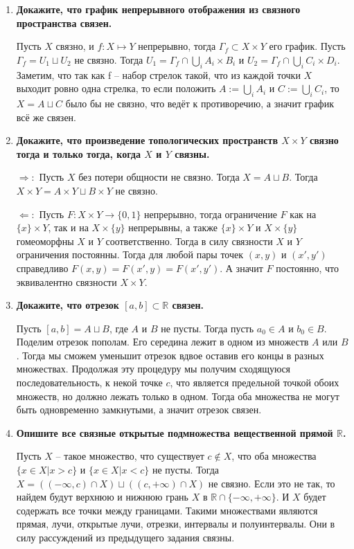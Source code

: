 \documentclass{article}
\begin{document}
\begin{enumerate}
    \item \textbf{Докажите, что график непрерывного отображения из связного
        пространства связен.} \par Пусть $X$ связно, и $f: X\mapsto Y$ непрерывно,
        тогда $\Gamma_f\subset X\times Y$ его график. Пусть $\Gamma_f=U_1\sqcup
        U_2$ не связно. Тогда $U_1=\Gamma_f\cap\bigcup_i A_i\times B_i$ и $U_2=
        \Gamma_f\cap\bigcup_iC_i\times D_i$. Заметим, что так как f – набор
        стрелок такой, что из каждой точки $X$ выходит ровно одна стрелка, то
        если положить $A:=\bigcup_i A_i$ и $C:=\bigcup_i C_i$, то $X=A\sqcup C$
        было бы не связно, что ведёт к противоречию, а значит график всё же
        связен.
    \item \textbf{Докажите, что произведение топологических пространств $X\times
        Y$ связно тогда и только тогда, когда $X$ и $Y$ связны.}\par
        $\Rightarrow:$ Пусть $X$ без потери общности не связно. Тогда $X=A\sqcup
        B$. Тогда $X\times Y = A\times Y\sqcup B\times Y$ не связно.\par
        $\Leftarrow:$ Пусть $F:X\times Y\longrightarrow \{0, 1\}$ непрерывно,
        тогда ограничение $F$ как на $\{x\}\times Y$, так и на $X\times \{y\}$
        непрерывны, а также $\{x\}\times Y$ и $X\times \{y\}$ гомеоморфны $X$ и
        $Y$ соответственно. Тогда в силу связности $X$ и $Y$ ограничения
        постоянны. Тогда для любой пары точек $(x,y)$ и $(x',y')$ справедливо
        $F(x,y)=F(x',y)=F(x',y')$. А значит $F$ постоянно, что эквивалентно
        связности $X\times Y$.
    \item \textbf{Докажите, что отрезок $[a, b]\subset \mathbb{R}$ связен.}\par
        Пусть $[a, b] = A\sqcup B$, где $A$ и $B$ не пусты. Тогда
        пусть $a_0\in A$ и $b_0\in B$. Поделим отрезок пополам. Его середина
        лежит в одном из множеств $A$ или $B$. Тогда мы сможем уменьшит отрезок
        вдвое оставив его концы в разных множествах. Продолжая эту процедуру мы
        получим сходящуюся последовательность, к некой точке $c$, что является
        предельной точкой обоих множеств, но должно лежать только в одном. Тогда
        оба множества не могут быть одновременно замкнутыми, а значит отрезок
        связен.
    \item \textbf{Опишите все связные открытые подмножества вещественной прямой
        $\mathbb{R}$.}\par
        Пусть $X$ – такое множество, что существует $c\notin X$, что оба
        множества $\{x\in X|x>c\}$ и $\{x\in X|x<c\}$ не пусты. Тогда $X=((-
        \infty,c)\cap X)\sqcup((c,+\infty)\cap X)$ не связно. Если это не так,
        то найдем будут верхнюю и нижнюю грань $X$ в $\mathbb{R}\cap\{
        -\infty,+\infty\}$. И $X$ будет содержать все точки между границами.
        Такими множествами являются прямая, лучи, открытые лучи, отрезки,
        интервалы и полуинтервалы. Они в силу рассуждений из предыдущего
        задания связны.

        
\end{enumerate}
\end{document}
